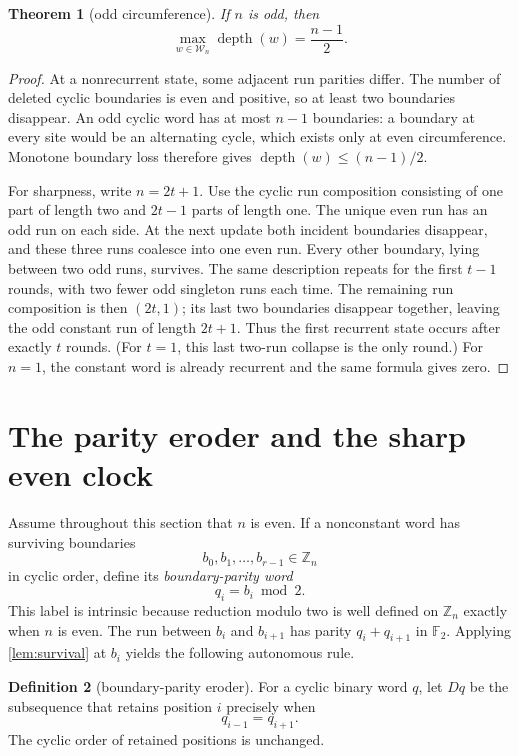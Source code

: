 \documentclass[11pt,a4paper]{amsart}
\newtheorem{theorem}{Theorem}[section]
\theoremstyle{definition}
\newtheorem{definition}[theorem]{Definition}
\theoremstyle{remark}
\newcommand{\depth}{\operatorname{depth}}
\begin{document}
\begin{theorem}[odd circumference]\label{thm:odd-depth}
If \(n\) is odd, then
\[
                   \max_{w\in\mathcal W_n}\depth(w)=\frac{n-1}{2}.
\]
\end{theorem}

\begin{proof}
At a nonrecurrent state, some adjacent run parities differ.  The number of
deleted cyclic boundaries is even and positive, so at least two boundaries
disappear.  An odd cyclic word has at most \(n-1\) boundaries: a boundary at
every site would be an alternating cycle, which exists only at even
circumference.  Monotone boundary loss therefore gives
\(\depth(w)\le(n-1)/2\).

For sharpness, write \(n=2t+1\).  Use the cyclic run composition consisting
of one part of length two and \(2t-1\) parts of length one.  The unique even
run has an odd run on each side.  At the next update both incident
boundaries disappear, and these three runs coalesce into one even run.
Every other boundary, lying between two odd runs, survives.  The same
description repeats for the first \(t-1\) rounds, with two fewer odd
singleton runs each time.  The remaining run composition is then
\((2t,1)\); its last two boundaries disappear together, leaving the odd
constant run of length \(2t+1\).  Thus the first recurrent state occurs
after exactly \(t\) rounds.  (For \(t=1\), this last two-run collapse is the
only round.)  For \(n=1\), the constant word is already recurrent and the
same formula gives zero.
\end{proof}

\section{The parity eroder and the sharp even clock}

Assume throughout this section that \(n\) is even.  If a nonconstant word
has surviving boundaries
\[
                  b_0,b_1,\ldots,b_{r-1}\in\mathbb Z_n
\]
in cyclic order, define its \emph{boundary-parity word}
\[
                         q_i=b_i\bmod2.
\]
This label is intrinsic because reduction modulo two is well defined on
\(\mathbb Z_n\) exactly when \(n\) is even.  The run between \(b_i\) and
\(b_{i+1}\) has parity \(q_i+q_{i+1}\) in \(\mathbb F_2\).  Applying
\cref{lem:survival} at \(b_i\) yields the following autonomous rule.

\begin{definition}[boundary-parity eroder]\label{def:eroder}
For a cyclic binary word \(q\), let \(Dq\) be the subsequence that retains
position \(i\) precisely when
\[
                            q_{i-1}=q_{i+1}.
\]
The cyclic order of retained positions is unchanged.
\end{definition}
\end{document}
